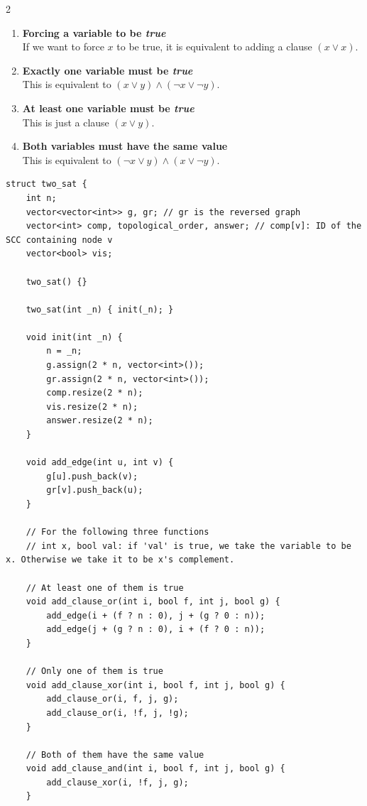 \documentclass[11pt]{article}
\begin{document}
\begin{multicols}{2}
\begin{enumerate}
    \item \textbf{Forcing a variable to be \textit{true}} \\
    If we want to force $x$ to be true, it is equivalent to adding a clause $(x \lor x)$.
    
    \item \textbf{Exactly one variable must be \textit{true}} \\
    This is equivalent to $(x \lor y) \land (\neg x \lor \neg y)$.
    
    \item \textbf{At least one variable must be \textit{true}} \\
    This is just a clause $(x \lor y)$.
    
    \item \textbf{Both variables must have the same value} \\
    This is equivalent to $(\neg x \lor y) \land (x \lor \neg y)$.
\end{enumerate}

\begin{lstlisting}
struct two_sat {
    int n;
    vector<vector<int>> g, gr; // gr is the reversed graph
    vector<int> comp, topological_order, answer; // comp[v]: ID of the SCC containing node v
    vector<bool> vis;

    two_sat() {}

    two_sat(int _n) { init(_n); }

    void init(int _n) {
        n = _n;
        g.assign(2 * n, vector<int>());
        gr.assign(2 * n, vector<int>());
        comp.resize(2 * n);
        vis.resize(2 * n);
        answer.resize(2 * n);
    }

    void add_edge(int u, int v) {
        g[u].push_back(v);
        gr[v].push_back(u);
    }

    // For the following three functions
    // int x, bool val: if 'val' is true, we take the variable to be x. Otherwise we take it to be x's complement.

    // At least one of them is true
    void add_clause_or(int i, bool f, int j, bool g) {
        add_edge(i + (f ? n : 0), j + (g ? 0 : n));
        add_edge(j + (g ? n : 0), i + (f ? 0 : n));
    }

    // Only one of them is true
    void add_clause_xor(int i, bool f, int j, bool g) {
        add_clause_or(i, f, j, g);
        add_clause_or(i, !f, j, !g);
    }

    // Both of them have the same value
    void add_clause_and(int i, bool f, int j, bool g) {
        add_clause_xor(i, !f, j, g);
    }


\end{lstlisting}
\end{multicols}
\end{document}
